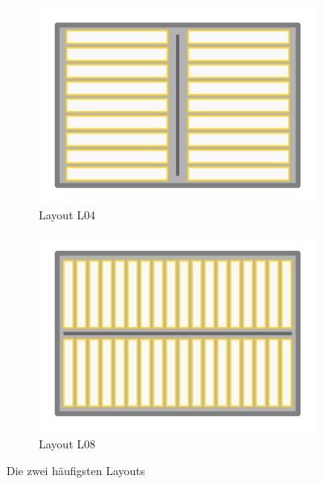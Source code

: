 \documentclass[parskip=full, a4paper]{scrartcl}
\begin{document}
\begin{figure}[htb]
	\centering
	\begin{subfigure}{0.48\linewidth}
		\includegraphics[keepaspectratio,width=\linewidth]{img/Layout04.png}
		\caption{Layout L04}
	\end{subfigure}
	\begin{subfigure}{0.48\linewidth}
		\includegraphics[keepaspectratio,width=\linewidth]{img/Layout08.png}
		\caption{Layout L08}
	\end{subfigure}
	\caption{Die zwei häufigsten Layouts}
	\label{fig:Layouts}
\end{figure}
\end{document}
